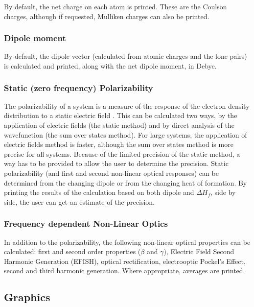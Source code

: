 By default, the net charge on each atom is printed.  These are the Coulson
charges, although if requested, Mulliken charges can also be printed.

\subsubsection*{Dipole moment}

By default, the dipole vector (calculated from atomic charges and the lone
pairs)  is calculated and printed, along with the net dipole moment, in Debye.

\subsubsection*{Static (zero frequency) Polarizability}

The polarizability of a system is a measure of the response of the electron
density distribution to a static electric field .  This can be calculated two
ways,  by the application of electric fields (the static method) and by direct
analysis of  the wavefunction (the sum over states method).  For large
systems, the  application of electric fields method is faster, although the sum
over states  method is more precise for all systems.   Because of the limited
precision of the  static method, a way has to be provided to allow the user to
determine the  precision.  Static polarizability (and first and second
non-linear optical  responses) can be determined from the changing dipole or
from the changing  heat of formation.  By printing the results of the
calculation based on both dipole  and $\Delta H_f$, side by side, the user can
get an estimate of the precision.

\subsubsection*{Frequency dependent Non-Linear Optics}

In addition to the polarizability, the following non-linear optical properties can
be calculated: first and second order properties ($\beta$ and $\gamma$),
Electric Field Second
Harmonic Generation (EFISH), optical rectification, electrooptic Pockel's
Effect, second and third harmonic generation. Where appropriate, averages are
printed.

\subsection{Graphics}

